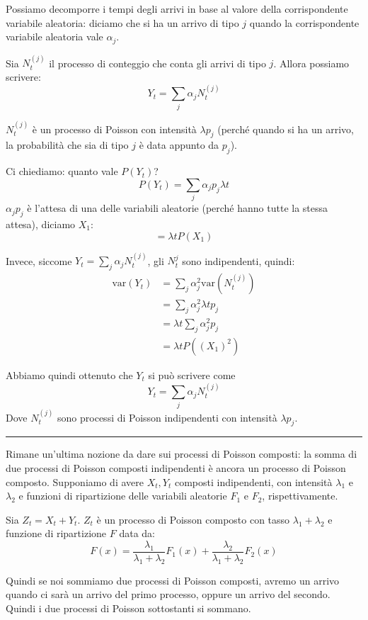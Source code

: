 \documentclass[a4paper,12pt]{book}
\begin{document}
Possiamo decomporre i tempi degli arrivi in base al valore della corrispondente variabile aleatoria: diciamo che si ha un arrivo di tipo $ j $ quando la corrispondente variabile aleatoria vale $ \alpha_{j} $. 

Sia $ N_t^{(j)} $ il processo di conteggio che conta gli arrivi di tipo $ j $. Allora possiamo scrivere:
$$ Y_t = \sum_{j} \alpha_{j} N_t^{(j)} $$

$ N_t^{(j)} $ è un processo di Poisson con intensità $\lambda p_j$ (perché quando si ha un arrivo, la probabilità che sia di tipo $ j $ è data appunto da $ p_j $). 

Ci chiediamo: quanto vale $ P(Y_t) $?
$$ P(Y_t) = \sum_{j}\alpha_{j} p_j \lambda t$$
$\alpha_{j} p_j$ è l'attesa di una delle variabili aleatorie (perché hanno tutte la stessa attesa), diciamo $ X_1 $:
$$ = \lambda t P(X_1) $$

Invece, siccome $ Y_t = \sum_{j} \alpha_{j} N_t^{(j)} $, gli $ N_t^{j} $ sono indipendenti, quindi:
\begin{align*}
	\text{var}(Y_t) & = \sum_{j} \alpha_j^2 \text{var}(N_t^{(j)}) \\
	& = \sum_{j} \alpha_j^2\lambda t p_j \\
	& = \lambda t \sum_{j} \alpha_j^2 p_j \\
	& = \lambda t P((X_1)^2)
\end{align*}

Abbiamo quindi ottenuto che $ Y_t $ si può scrivere come 
$$ Y_t = \sum_j \alpha_j N_t^{(j)} $$
Dove $ N_t^{(j)} $ sono processi di Poisson indipendenti con intensità $\lambda p_j$.


\vspace{1cm}
\hrule
\vspace{1cm}
Rimane un'ultima nozione da dare sui processi di Poisson composti: la somma di due processi di Poisson composti indipendenti è ancora un processo di Poisson composto. Supponiamo di avere $ X_t, Y_t $ composti indipendenti, con intensità $\lambda_1$ e $\lambda_2$ e funzioni di ripartizione delle variabili aleatorie $ F_1 $ e $ F_2 $, rispettivamente. 

Sia $Z_t = X_t + Y_t$. $ Z_t $ è un processo di Poisson composto con tasso $\lambda_1 + \lambda_{2}$ e funzione di ripartizione $ F $ data da:
$$ F(x)  = \frac{\lambda_1}{\lambda_1 + \lambda_{2}} F_1(x) + \frac{\lambda_{2}}{\lambda_{1} + \lambda_{2}}F_2(x)
$$

Quindi se noi sommiamo due processi di Poisson composti, avremo un arrivo quando ci sarà un arrivo del primo processo, oppure un arrivo del secondo. Quindi i due processi di Poisson sottostanti si sommano.
\end{document}
